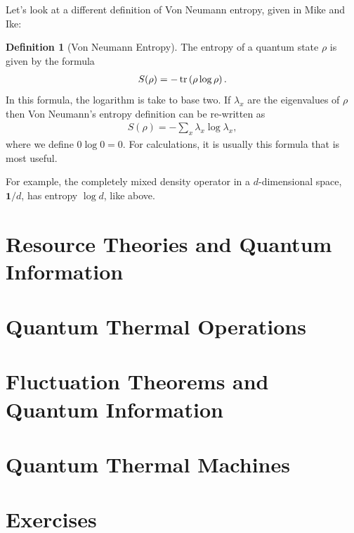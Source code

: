 \documentclass{book}
\theoremstyle{definition}
\newtheorem{defn}{Definition}[section]
\newcommand{\lp}{\left(}
\newcommand{\rp}{\right)}
\begin{document}
Let's look at a different definition of Von Neumann entropy, given in Mike and Ike:
\begin{defn}[Von Neumann Entropy]
	The entropy of a quantum state $\rho$ is given by the formula
	\begin{align}
	S(\rho) = -\tr\lp \rho \log \rho \rp.
	\end{align}
	In this formula, the logarithm is take to base two. If $\lambda_x$ are the eigenvalues of $\rho$ then Von Neumann's entropy definition can be re-written as
	\begin{align}
	S(\rho) = -\sum_x \lambda_x \log \lambda_x,
	\end{align}
	where we define $0 \log 0 = 0$. For calculations, it is usually this formula that is most useful. 
\end{defn}


For example, the completely mixed density operator in a $d$-dimensional space, $\bm{1}/d$, has entropy $\log d$, like above. 









\newpage

\section{Resource Theories and Quantum Information}


\newpage
\section{Quantum Thermal Operations}


\newpage
\section{Fluctuation Theorems and Quantum Information}


\newpage
\section{Quantum Thermal Machines}




\newpage


\section{Exercises}
\end{document}
